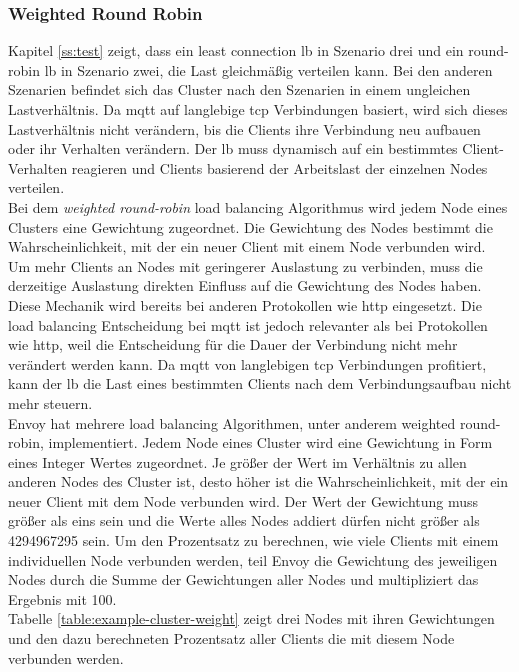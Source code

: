 \subsubsection{Weighted Round Robin} \label{ss:weighted-rr}
Kapitel \ref{ss:test} zeigt, dass ein least connection \acl{lb} in Szenario drei und ein round-robin \ac{lb} in Szenario zwei, die Last gleichmä{\ss}ig verteilen kann. Bei den anderen Szenarien befindet sich das Cluster nach den Szenarien in einem ungleichen Lastverhältnis. Da \ac{mqtt} auf langlebige \ac{tcp} Verbindungen basiert, wird sich dieses Lastverhältnis nicht verändern, bis die Clients ihre Verbindung neu aufbauen oder ihr Verhalten verändern.
Der \ac{lb} muss dynamisch auf ein bestimmtes Client-Verhalten reagieren und Clients basierend der Arbeitslast der einzelnen Nodes verteilen.
\\
Bei dem \textit{weighted round-robin} load balancing Algorithmus wird jedem Node eines Clusters eine Gewichtung zugeordnet. Die Gewichtung des Nodes bestimmt die Wahrscheinlichkeit, mit der ein neuer Client mit einem Node verbunden wird.
Um mehr Clients an Nodes mit geringerer Auslastung zu verbinden, muss die derzeitige Auslastung direkten Einfluss auf die Gewichtung des Nodes haben.
Diese Mechanik wird bereits bei anderen Protokollen wie \ac{http} eingesetzt.
Die load balancing Entscheidung bei \ac{mqtt} ist jedoch relevanter als bei Protokollen wie \ac{http}, weil die Entscheidung für die Dauer der Verbindung nicht mehr verändert werden kann. Da \ac{mqtt} von langlebigen \ac{tcp} Verbindungen profitiert, kann der \ac{lb} die Last eines bestimmten Clients nach dem Verbindungsaufbau nicht mehr steuern.
\\
Envoy hat mehrere load balancing Algorithmen, unter anderem weighted round-robin, implementiert. Jedem Node eines Cluster wird eine Gewichtung in Form eines Integer Wertes zugeordnet. Je grö{\ss}er der Wert im Verhältnis zu allen anderen Nodes des Cluster ist, desto höher ist die Wahrscheinlichkeit, mit der ein neuer Client mit dem Node verbunden wird. Der Wert der Gewichtung muss grö{\ss}er als eins sein und die Werte alles Nodes addiert dürfen nicht grö{\ss}er als 4294967295 sein.
Um den Prozentsatz zu berechnen, wie viele Clients mit einem individuellen Node verbunden werden, teil Envoy die Gewichtung des jeweiligen Nodes durch die Summe der Gewichtungen aller Nodes und multipliziert das Ergebnis mit 100.
\cite{SupportedLoadBalancers}
\\
Tabelle \ref{table:example-cluster-weight} zeigt drei Nodes mit ihren Gewichtungen und den dazu berechneten Prozentsatz aller Clients die mit diesem Node verbunden werden.
